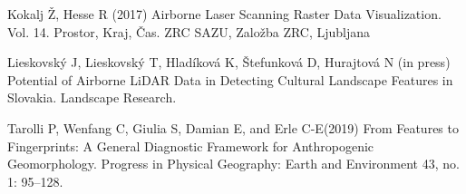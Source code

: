 {Kokalj Ž, Hesse R (2017) Airborne Laser Scanning Raster Data Visualization. Vol. 14. Prostor, Kraj, Čas. ZRC SAZU, Založba ZRC, Ljubljana
	
Lieskovský J, Lieskovský T, Hladíková K, Štefunková D, Hurajtová N (in press) Potential of Airborne LiDAR Data in Detecting Cultural Landscape Features in Slovakia. Landscape Research.
	
Tarolli P, Wenfang C, Giulia S, Damian E, and Erle C-E(2019) From Features to Fingerprints: A General Diagnostic Framework for Anthropogenic Geomorphology. Progress in Physical Geography: Earth and Environment 43, no. 1: 95–128.}%




